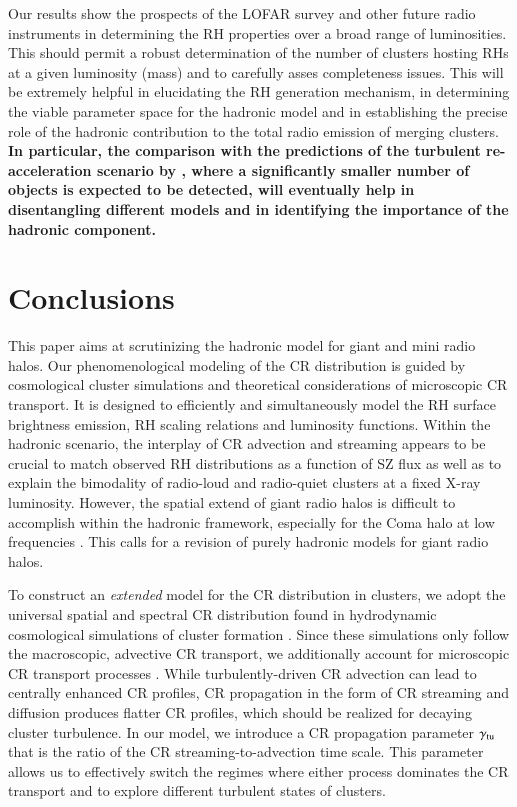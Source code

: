 \documentclass[useAMS,usenatbib]{mn2e}
\begin{document}
Our results show the prospects of the LOFAR survey and other future radio
instruments in determining the RH properties over a broad range of luminosities.
This should permit a robust determination of the number of clusters hosting RHs 
at a given luminosity (mass) and to carefully asses completeness issues. This will 
be extremely helpful in elucidating the RH generation mechanism, in determining the 
viable parameter space for the hadronic model and in establishing the precise role of 
the hadronic contribution to the total radio emission of merging clusters. 
{\bf In particular, the comparison with the predictions of the turbulent re-acceleration 
scenario by \cite{2010A&A...509A..68C,2012arXiv1210.1020C}, where a significantly
smaller number of objects is expected to be detected, will eventually help in disentangling 
different models and in identifying the importance of the hadronic component.}


\section{Conclusions}
\label{sec:6}

This paper aims at scrutinizing the hadronic model for giant and mini radio
halos. Our phenomenological modeling of the CR distribution is guided by
cosmological cluster simulations and theoretical considerations of microscopic
CR transport. It is designed to efficiently and simultaneously model the RH
surface brightness emission, RH scaling relations and luminosity
functions. Within the hadronic scenario, the interplay of CR advection and
streaming appears to be crucial to match observed RH distributions as a function
of SZ flux as well as to explain the bimodality of radio-loud and radio-quiet
clusters at a fixed X-ray luminosity. However, the spatial extend of giant radio
halos is difficult to accomplish within the hadronic framework, especially for
the Coma halo at low frequencies \citep{2012arXiv1207.3025B}. This calls for a
revision of purely hadronic models for giant radio halos.

To construct an \emph{extended} model for the CR distribution in clusters, we
adopt the universal spatial and spectral CR distribution found in hydrodynamic
cosmological simulations of cluster formation \citep{2010MNRAS.409..449P}. Since
these simulations only follow the macroscopic, advective CR transport, we
additionally account for microscopic CR transport processes
\citep{2011A&A...527A..99E,2013arXiv1303.4746W}. While turbulently-driven CR 
advection can lead to centrally enhanced CR profiles, CR propagation in the form 
of CR streaming and diffusion produces flatter CR profiles, which should be realized 
for decaying cluster turbulence. In our model, we introduce a CR propagation parameter
$\gamma_{{\mathrm{tu}}}$ that is the ratio of the CR streaming-to-advection time
scale. This parameter allows us to effectively switch the regimes where either
process dominates the CR transport and to explore different turbulent states of
clusters.
\end{document}
